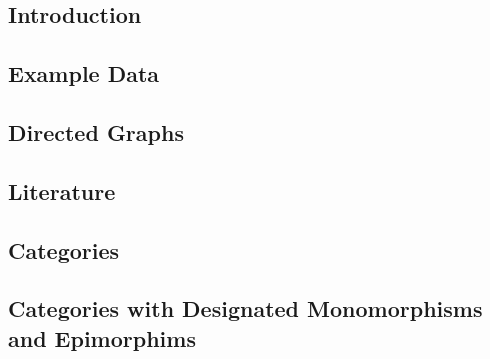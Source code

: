\subsection{Introduction}


\subsection{Example Data}


\subsection{Directed Graphs}


\subsection{Literature}


\subsection{Categories}

\fi 

\subsection{Categories with Designated Monomorphisms and Epimorphims}


\iffalse
\subsection{Categories with Finite Products and Designated Monomorphisms and Epimorphims}


\subsection{Entity-Relationship Notation}


\subsection{Unused}

\fi

